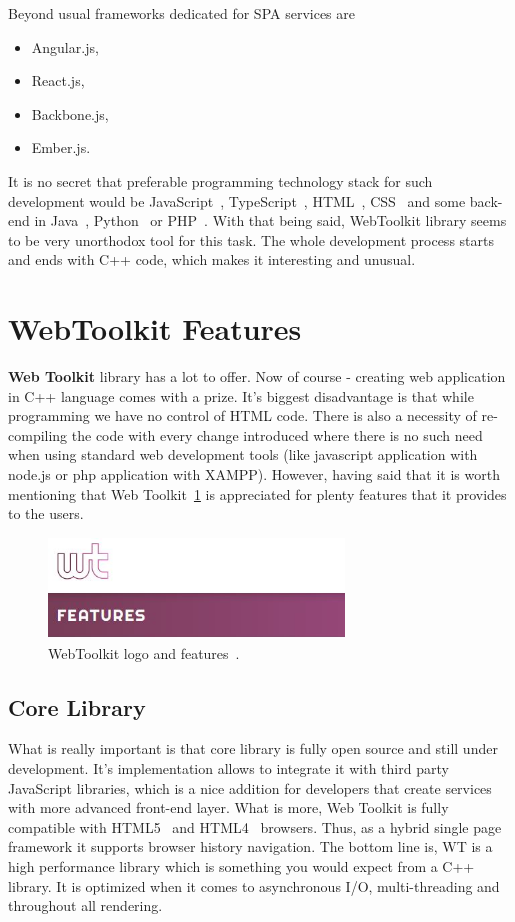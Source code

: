 \documentclass[a4paper,12pt]{book}
\newcommand\tab[1][1cm]{\hspace*{#1}}
\begin{document}
{{\bigskip
Beyond usual frameworks dedicated for SPA services are
\begin{itemize}
	\item Angular.js,
	\item React.js,
	\item Backbone.js,
	\item Ember.js.
\end{itemize}

It is no secret that preferable programming technology stack for such development would be JavaScript~\cite{javascript}, TypeScript~\cite{typescript}, HTML~\cite{html}, CSS~\cite{css} and some back-end in Java~\cite{java}, Python~\cite{python} or PHP~\cite{php}. With that being said, WebToolkit library seems to be very unorthodox tool for this task. The whole development process starts and ends with C++ code, which makes it interesting and unusual.

\newpage

}
\section{WebToolkit Features}
{
\tab \textbf{Web Toolkit} library has a lot to offer. Now of course - creating web application in C++ language comes with a prize. It's biggest disadvantage is that while programming we have no control of HTML code. There is also a necessity of re-compiling the code with every change introduced where there is no such need when using standard web development tools (like javascript application with node.js or php application with XAMPP). However, having said that it is worth mentioning that Web Toolkit~\ref{fig:wtlogoz} is appreciated for plenty features that it provides to the users.
 
\begin{figure}[h]
  \centering
    \includegraphics[width=0.7\textwidth]{features}
    \caption{WebToolkit logo and features~\cite{wtlogo}.}
    \label{fig:wtlogoz}
\end{figure}

\subsection*{Core Library} 
{
\tab What is really important is that core library is fully open source and still under development. It's implementation allows to integrate it with third party JavaScript libraries, which is a nice addition for developers that create services with more advanced front-end layer. What is more, Web Toolkit is fully compatible with HTML5~\cite{html5} and HTML4~\cite{html4} browsers. Thus, as a hybrid single page framework it supports browser history navigation. The bottom line is, WT is a high performance library which is something you would expect from a C++ library. It is optimized when it comes to asynchronous I/O, multi-threading and throughout all rendering.

}}}
\end{document}
